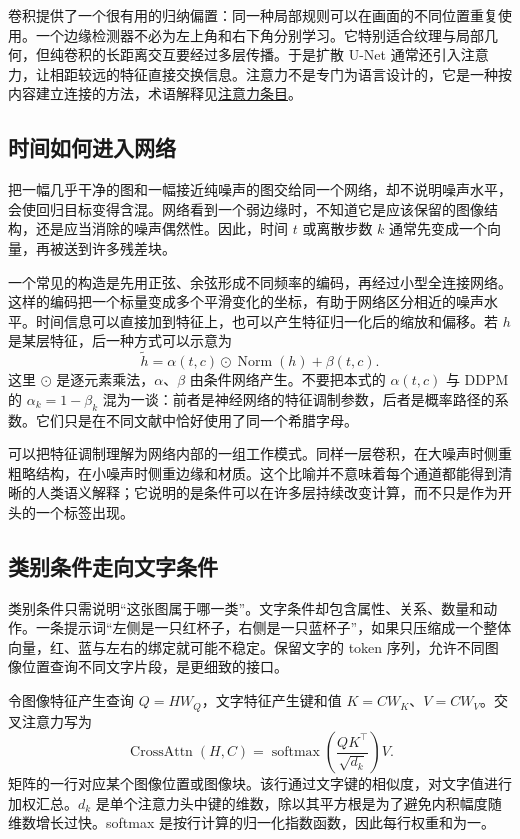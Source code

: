 卷积提供了一个很有用的归纳偏置：同一种局部规则可以在画面的不同位置重复使用。一个边缘检测器不必为左上角和右下角分别学习。它特别适合纹理与局部几何，但纯卷积的长距离交互要经过多层传播。于是扩散 U-Net 通常还引入注意力，让相距较远的特征直接交换信息。注意力不是专门为语言设计的，它是一种按内容建立连接的方法，术语解释见\hyperref[gl:attention]{注意力条目}。

\subsection{时间如何进入网络}

把一幅几乎干净的图和一幅接近纯噪声的图交给同一个网络，却不说明噪声水平，会使回归目标变得含混。网络看到一个弱边缘时，不知道它是应该保留的图像结构，还是应当消除的噪声偶然性。因此，时间 $t$ 或离散步数 $k$ 通常先变成一个向量，再被送到许多残差块。

一个常见的构造是先用正弦、余弦形成不同频率的编码，再经过小型全连接网络。这样的编码把一个标量变成多个平滑变化的坐标，有助于网络区分相近的噪声水平。时间信息可以直接加到特征上，也可以产生特征归一化后的缩放和偏移。若 $h$ 是某层特征，后一种方式可以示意为
\[
\widetilde h=\alpha(t,c)\odot\operatorname{Norm}(h)+\beta(t,c).
\]
这里 $\odot$ 是逐元素乘法，$\alpha$、$\beta$ 由条件网络产生。不要把本式的 $\alpha(t,c)$ 与 DDPM 的 $\alpha_k=1-\beta_k$ 混为一谈：前者是神经网络的特征调制参数，后者是概率路径的系数。它们只是在不同文献中恰好使用了同一个希腊字母。

可以把特征调制理解为网络内部的一组工作模式。同样一层卷积，在大噪声时侧重粗略结构，在小噪声时侧重边缘和材质。这个比喻并不意味着每个通道都能得到清晰的人类语义解释；它说明的是条件可以在许多层持续改变计算，而不只是作为开头的一个标签出现。

\subsection{类别条件走向文字条件}

类别条件只需说明“这张图属于哪一类”。文字条件却包含属性、关系、数量和动作。一条提示词“左侧是一只红杯子，右侧是一只蓝杯子”，如果只压缩成一个整体向量，红、蓝与左右的绑定就可能不稳定。保留文字的 token 序列，允许不同图像位置查询不同文字片段，是更细致的接口。

令图像特征产生查询 $Q=H W_Q$，文字特征产生键和值 $K=CW_K$、$V=CW_V$。交叉注意力写为
\begin{equation}
\operatorname{CrossAttn}(H,C)
=\operatorname{softmax}\!\left(\frac{QK^\top}{\sqrt{d_k}}\right)V.
\label{eq:application-crossattention}
\end{equation}
矩阵的一行对应某个图像位置或图像块。该行通过文字键的相似度，对文字值进行加权汇总。$d_k$ 是单个注意力头中键的维数，除以其平方根是为了避免内积幅度随维数增长过快。softmax 是按行计算的归一化指数函数，因此每行权重和为一。

